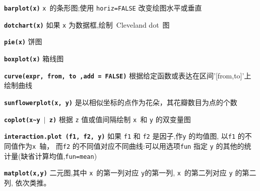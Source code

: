 \documentclass[landscape]{article}
\newcommand{\code}{\texttt}
\newcommand{\bcode}[1]{\texttt{\textbf{#1}}}
\begin{document}
\begin{multicols*}{3}

\bcode{barplot(x)}   \code{x}~的条形图;使用 \code{horiz=FALSE} 改变绘图水平或垂直

\bcode{dotchart(x)} 如果 \code{x} 为数据框,绘制~Cleveland dot~图

\bcode{pie(x)}  饼图

\bcode{boxplot(x)}  箱线图

\bcode{curve(expr, from, to ,add = FALSE)}  根据给定函数或表达在区间'[from,to]'上绘制曲线

\bcode{sunflowerplot(x, y)}  是以相似坐标的点作为花朵，其花瓣数目为点的个数

\bcode{coplot(x\~{}y $\mid$ z)}   根据 \code{z} 值或值间隔绘制 \code{x}~和 \code{y} 的双变量图

\bcode{interaction.plot (f1, f2, y)}  如果 \code{f1} 和 \code{f2} 是因子,作\code{y} 的均值图,
以\code{f1} 的不同值作为\code{x}~轴，
而\code{f2} 的不同值对应不同曲线:可以用选项\code{fun} 指定 \code{y} 的其他的统计量(缺省计算均值,\code{fun=mean})

\bcode{matplot(x,y)}  二元图,其中 \code{x}~的第一列对应 \code{y}的第一列, \code{x}~的第二列对应  \code{y} 的第二列,
依次类推。


\end{multicols*}
\end{document}
